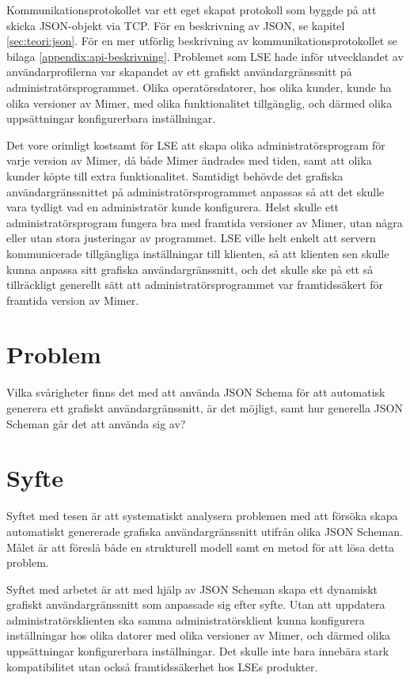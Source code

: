 Kommunikationsprotokollet var ett eget skapat protokoll som byggde på att skicka JSON-objekt via TCP. För en beskrivning av JSON, se kapitel \ref{sec:teori:json}. För en mer utförlig beskrivning av kommunikationsprotokollet se bilaga \ref{appendix:api-beskrivning}. Problemet som LSE hade inför utvecklandet av användarprofilerna var skapandet av ett grafiskt användargränssnitt på administratörsprogrammet. Olika operatörsdatorer, hos olika kunder, kunde ha olika versioner av Mimer, med olika funktionalitet tillgänglig, och därmed olika uppsättningar konfigurerbara inställningar. 

Det vore orimligt kostsamt för LSE att skapa olika administratörsprogram för varje version av Mimer, då både Mimer ändrades med tiden, samt att olika kunder köpte till extra funktionalitet. Samtidigt behövde det grafiska användargränssnittet på administratörsprogrammet anpassas så att det skulle vara tydligt vad en administratör kunde konfigurera. Helst skulle ett administratörsprogram fungera bra med framtida versioner av Mimer, utan några eller utan stora justeringar av programmet. LSE ville helt enkelt att servern kommunicerade tillgängliga inställningar till klienten, så att klienten sen skulle kunna anpassa sitt grafiska användargränssnitt, och det skulle ske på ett så tillräckligt generellt sätt att administratörsprogrammet var framtidssäkert för framtida version av Mimer.

\section{Problem}
\label{sec:intro:problem}
Vilka svårigheter finns det med att använda JSON Schema för att automatisk generera ett grafiskt användargränssnitt, är det möjligt, samt hur generella JSON Scheman går det att använda sig av?

\section{Syfte}
\label{sec:intro:syfte}
Syftet med tesen är att systematiskt analysera problemen med att försöka skapa automatiskt genererade grafiska användargränssnitt utifrån olika JSON Scheman. Målet är att föreslå både en strukturell modell samt en metod för att lösa detta problem.

Syftet med arbetet är att med hjälp av JSON Scheman skapa ett dynamiskt grafiskt användargränssnitt som anpassade sig efter syfte. Utan att uppdatera administratörsklienten ska samma administratörsklient kunna konfigurera inställningar hos olika datorer med olika versioner av Mimer, och därmed olika uppsättningar konfigurerbara inställningar. Det skulle inte bara innebära stark kompatibilitet utan också framtidssäkerhet hos LSEs produkter.

